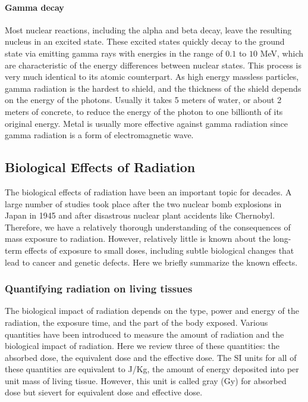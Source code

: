 \documentclass[nofootinbib,preprint,aip,pra]{revtex4-1}
\begin{document}
        \paragraph{Gamma decay}
        Most nuclear reactions, including the alpha and beta decay, leave the resulting nucleus in an excited state.
        These excited states quickly decay to the ground state via emitting gamma rays with energies in the range
        of $0.1$ to $10$ MeV, which are characteristic of the energy differences between nuclear states.
        This process is very much identical to its atomic counterpart. As high energy massless particles, gamma
        radiation is the hardest to shield, and the thickness of the shield depends on the energy of the photons.
        Usually it takes 5 meters of water, or about 2 meters of concrete,  to reduce the energy of the photon
        to one billionth of its original energy. Metal is usually more effective against gamma radiation since
        gamma radiation is a form of electromagnetic wave.\cite{l01}

    \subsection{Biological Effects of Radiation}
        The biological effects of radiation have been an important topic for decades. A large
        number of studies took place after the two nuclear bomb explosions in Japan in 1945
        and after disastrous nuclear plant accidents like Chernobyl. Therefore, we have a relatively
        thorough understanding of the consequences of mass exposure to radiation. However, relatively
        little is known about the long-term effects of exposure to small doses, including subtle biological
        changes that lead to cancer and genetic defects. Here we briefly summarize the known effects.
        \subsubsection{Quantifying radiation on living tissues}
        The biological impact of radiation depends on the type, power and energy of the radiation, the
        exposure time, and the part of the body exposed. Various quantities have been introduced to
        measure the amount of radiation and the biological impact of radiation. Here we review three
        of these quantities: the absorbed dose, the equivalent dose and the effective dose.
        The SI units for all of these quantities are equivalent to J/Kg, the amount of energy deposited into
        per unit mass of living tissue. However, this unit is called gray (Gy) for absorbed dose but sievert
        for equivalent dose and effective dose.
\end{document}
